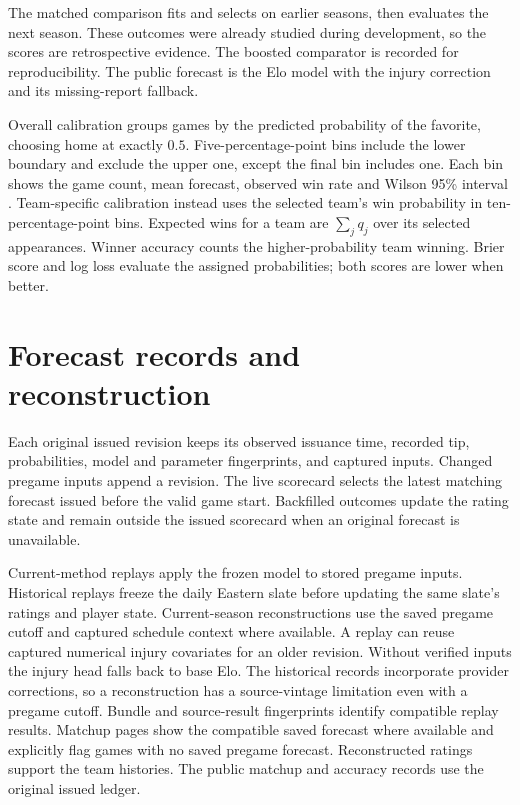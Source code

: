 \documentclass[11pt]{article}
\begin{document}
The matched comparison \cite{evaluation} fits and selects on earlier
seasons, then evaluates the next season. These outcomes were already
studied during development, so the scores are retrospective evidence.
The boosted comparator is recorded for reproducibility. The public
forecast is the Elo model with the injury correction and its missing-report
fallback.

Overall calibration groups games by the predicted probability of the
favorite, choosing home at exactly $0.5$. Five-percentage-point bins
include the lower boundary and exclude the upper one, except the final
bin includes one. Each bin shows the game count, mean forecast, observed
win rate and Wilson 95\% interval \cite{wilson}. Team-specific
calibration instead uses the selected team's win probability in
ten-percentage-point bins. Expected wins for a team are
$\sum_j q_j$ over its selected appearances. Winner accuracy counts
the higher-probability team winning. Brier score and log loss evaluate
the assigned probabilities; both scores are lower when better.

\section{Forecast records and reconstruction}
Each original issued revision keeps its observed issuance time, recorded
tip, probabilities, model and parameter fingerprints, and captured
inputs. Changed pregame inputs append a revision. The live scorecard
selects the latest matching forecast issued before the valid game start.
Backfilled outcomes update the rating state and remain outside the
issued scorecard when an original forecast is unavailable.

Current-method replays apply the frozen model to stored pregame inputs.
Historical replays freeze the daily Eastern slate before updating the
same slate's ratings and player state. Current-season reconstructions
use the saved pregame cutoff and captured schedule context where
available. A replay can reuse captured numerical injury covariates for
an older revision. Without verified inputs the injury head falls back to
base Elo. The historical records incorporate provider corrections, so a
reconstruction has a source-vintage limitation even with a pregame
cutoff. Bundle and source-result fingerprints identify compatible
replay results. Matchup pages show the compatible saved forecast where
available and explicitly flag games with no saved pregame forecast.
Reconstructed ratings support the team histories. The public matchup and
accuracy records use the original issued ledger.
\end{document}
